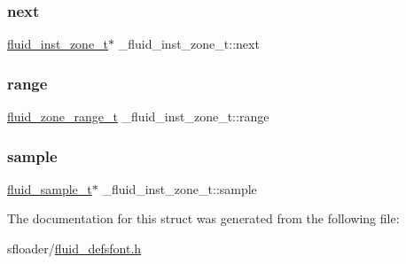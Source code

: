 \subsubsection{\texorpdfstring{next}{next}}
{\footnotesize\ttfamily \hyperlink{fluid__defsfont_8h_aa02ac18b4c58545cc3b297bdf4d933ab}{fluid\+\_\+inst\+\_\+zone\+\_\+t}$\ast$ \+\_\+fluid\+\_\+inst\+\_\+zone\+\_\+t\+::next}

\mbox{\label{struct__fluid__inst__zone__t_a748cbb2b5f058a6a391b27e627e85e42}} 
\subsubsection{\texorpdfstring{range}{range}}
{\footnotesize\ttfamily \hyperlink{fluidsynth__priv_8h_ac8502f0049ba8c20821b136e611462da}{fluid\+\_\+zone\+\_\+range\+\_\+t} \+\_\+fluid\+\_\+inst\+\_\+zone\+\_\+t\+::range}

\mbox{\label{struct__fluid__inst__zone__t_a35d1af8ed2864340ded7f1115a22cbef}} 
\subsubsection{\texorpdfstring{sample}{sample}}
{\footnotesize\ttfamily \hyperlink{types_8h_abf9174d452679ca1a4ee7d693fb773cf}{fluid\+\_\+sample\+\_\+t}$\ast$ \+\_\+fluid\+\_\+inst\+\_\+zone\+\_\+t\+::sample}



The documentation for this struct was generated from the following file\+:\begin{DoxyCompactItemize}
\item 
sfloader/\hyperlink{fluid__defsfont_8h}{fluid\+\_\+defsfont.\+h}\end{DoxyCompactItemize}
